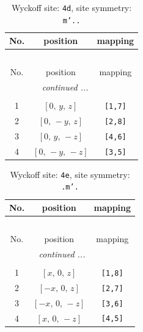 \documentclass[fleqn,8pt]{jsarticle}
\begin{document}
\begin{longtable}{ccc}
\caption{Wyckoff site: {\tt 4d}, site symmetry: {\tt m'..}}
 \\
 \hline \hline
No. & position & mapping \\ \hline \endfirsthead

\multicolumn{2}{l}{\tablename\ \thetable{}} \\
 \hline \hline
No. & position & mapping \\ \hline \endhead

 \hline \hline
\multicolumn{2}{r}{\footnotesize\it continued ...} \\ \endfoot

 \hline \hline
\multicolumn{2}{r}{} \\ \endlastfoot

1 & $\left[ 0,\, y,\, z \right]$ & {\tt [1,7]} \\ \hline
2 & $\left[ 0,\, - y,\, z \right]$ & {\tt [2,8]} \\ \hline
3 & $\left[ 0,\, y,\, - z \right]$ & {\tt [4,6]} \\ \hline
4 & $\left[ 0,\, - y,\, - z \right]$ & {\tt [3,5]} \\
\end{longtable}
\renewcommand{\arraystretch}{1.2}
\begin{longtable}{ccc}
\caption{Wyckoff site: {\tt 4e}, site symmetry: {\tt .m'.}}
 \\
 \hline \hline
No. & position & mapping \\ \hline \endfirsthead

\multicolumn{2}{l}{\tablename\ \thetable{}} \\
 \hline \hline
No. & position & mapping \\ \hline \endhead

 \hline \hline
\multicolumn{2}{r}{\footnotesize\it continued ...} \\ \endfoot

 \hline \hline
\multicolumn{2}{r}{} \\ \endlastfoot

1 & $\left[ x,\, 0,\, z \right]$ & {\tt [1,8]} \\ \hline
2 & $\left[ - x,\, 0,\, z \right]$ & {\tt [2,7]} \\ \hline
3 & $\left[ - x,\, 0,\, - z \right]$ & {\tt [3,6]} \\ \hline
4 & $\left[ x,\, 0,\, - z \right]$ & {\tt [4,5]} \\
\end{longtable}
\renewcommand{\arraystretch}{1.2}
\end{document}
